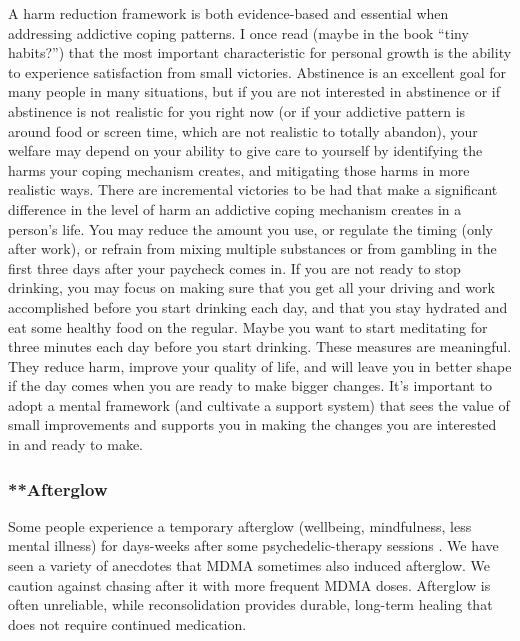 \documentclass[12pt,letterpaper]{book}
\begin{document}
A harm reduction framework is both evidence-based and essential when addressing addictive coping patterns. I once read (maybe in the book “tiny habits?”) that the most important characteristic for personal growth is the ability to experience satisfaction from small victories. Abstinence is an excellent goal for many people in many situations, but if you are not interested in abstinence or if abstinence is not realistic for you right now (or if your addictive pattern is around food or screen time, which are not realistic to totally abandon), your welfare may depend on your ability to give care to yourself by identifying the harms your coping mechanism creates, and mitigating those harms in more realistic ways. There are incremental victories to be had that make a significant difference in the level of harm an addictive coping mechanism creates in a person's life. You may reduce the amount you use, or regulate the timing (only after work), or refrain from mixing multiple substances or from gambling in the first three days after your paycheck comes in. If you are not ready to stop drinking, you may focus on making sure that you get all your driving and work accomplished before you start drinking each day, and that you stay hydrated and eat some healthy food on the regular. Maybe you want to start meditating for three minutes each day before you start drinking. These measures are meaningful. They reduce harm, improve your quality of life, and will leave you in better shape if the day comes when you are ready to make bigger changes. It's important to adopt a mental framework (and cultivate a support system) that sees the value of small improvements and supports you in making the changes you are interested in and ready to make.
\subsubsection{**Afterglow}
Some people experience a temporary afterglow (wellbeing, mindfulness, less mental illness) for days-weeks after some psychedelic-therapy sessions \cite{evansAfterglow}. We have seen a variety of anecdotes that MDMA sometimes also induced afterglow. We caution against chasing after it with more frequent MDMA doses. Afterglow is often unreliable, while reconsolidation provides durable, long-term healing that does not require continued medication.
\FloatBarrier
\end{document}
